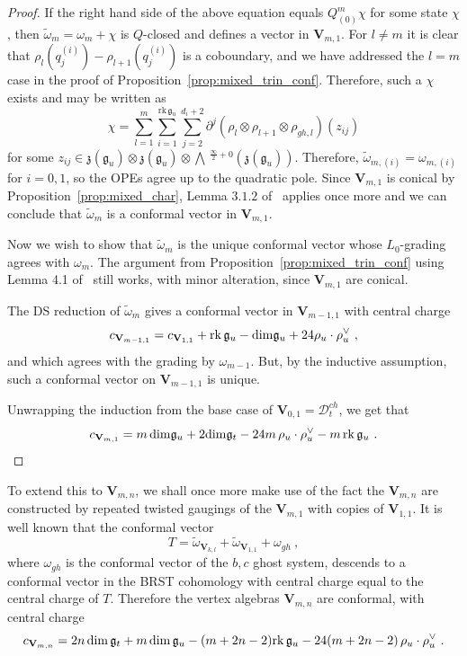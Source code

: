 \documentclass[a4paper]{article}
\def\dim{{\rm dim}}
\def\gf{\mathfrak{g}}
\def \zf{\mathfrak{z}}
\def \rk{\mathrm{rk}}
\newcommand{\Li}[1]{\mathrm{\bigwedge}\,^{\frac{\infty}{2}+#1}}
\def\D{\mathcal{D}^{ch}}
\def\V{\mathbf{V}}
\begin{document}
\begin{proof}
If the right hand side of the above equation equals $Q^m_{(0)}\chi$ for some state $\chi$, then $\widetilde{\omega}_m = \omega_m + \chi$ is $Q$-closed and defines a vector in $\V_{m,1}$.
For $l\neq m$ it is clear that $\rho_l(q_j^{(i)})-\rho_{l+1}(q_j^{(i)})$ is a coboundary, and we have addressed the $l=m$ case in the proof of Proposition~\ref{prop:mixed_trin_conf}. Therefore, such a $\chi$ exists and may be written as
\begin{equation*}
	\chi = \sum_{l=1}^m\sum_{i=1}^{\mathrm{rk}\, \gf_u}\sum_{j=2}^{d_i+2} \partial^j (\rho_{l}\otimes \rho_{l+1}\otimes \rho_{gh,l})(z_{ij})
\end{equation*}
for some $z_{ij} \in \zf(\gf_u)\otimes\zf(\gf_u)\otimes \Li{0}(\zf(\gf_u))$. Therefore, $\widetilde{\omega}_{m,(i)}=\omega_{m,(i)}$ for $i=0,1$, so the OPEs agree up to the quadratic pole. Since $\V_{m,1}$ is conical by Proposition~\ref{prop:mixed_char}, Lemma $3.1.2$ of~\cite{Frenkel:2007} applies once more and we can conclude that $\widetilde{\omega}_m$ is a conformal vector in $\V_{m,1}$.

Now we wish to show that $\widetilde{\omega}_m$ is the unique conformal vector whose $L_0$-grading agrees with $\omega_m$. The argument from Proposition~\ref{prop:mixed_trin_conf} using Lemma 4.1 of~\cite{Moriwaki_2020} still works, with minor alteration, since $\V_{m,1}$ are conical.

The DS reduction of $\widetilde{\omega}_m$ gives a conformal vector in $\V_{m-1,1}$ with central charge
\begin{equation*}
	c_{\V_{m-1,1}} = c_{\V_{1,1}} +\rk\,\gf_u - \dim \gf_{u} +24 \rho_{u}\cdot\rho^\vee_{u}~,
\end{equation*}
and which agrees with the grading by $\omega_{m-1}$. But, by the inductive assumption, such a conformal vector on $\V_{m-1,1}$ is unique.

Unwrapping the induction from the base case of $\V_{0,1}=\D_t$, we get that
\begin{equation*}
c_{\V_{m,1}} = m\,\dim \gf_u + 2\dim \gf_t -24m\,\rho_u\cdot\rho_u^\vee -m\, \rk\,\gf_u~.
\end{equation*}
\end{proof}
\vspace{-6pt}

To extend this to $\V_{m,n}$, we shall once more make use of the fact the $\V_{m,n}$ are constructed by repeated twisted gaugings of the $\V_{m,1}$ with copies of $\V_{1,1}$. It is well known that the conformal vector
\begin{equation}
	T = \widetilde{\omega}_{\V_{k,l}} + \widetilde{\omega}_{\V_{1,1}} +\omega_{gh} ~,
\end{equation}
where $\omega_{gh}$ is the conformal vector of the $b,c$ ghost system, descends to a conformal vector in the BRST cohomology with central charge equal to the central charge of $T$. Therefore the vertex algebras $\V_{m,n}$ are conformal, with central charge
\begin{equation}
	c_{\V_{m,n}} = 2n\, \dim\,\gf_t + m\, \dim\,\gf_u - (m+2n-2)\rk\,\gf_u -24(m+2n-2)\,\rho_u\cdot\rho_u^\vee~.
\end{equation}
\end{document}
